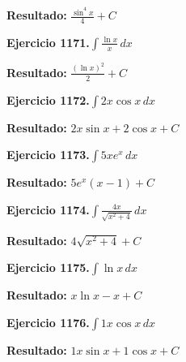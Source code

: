 \documentclass[10pt,a4paper]{article}
\begin{document}
\begin{solbox}
\textbf{Resultado:} \(\displaystyle \frac{\sin^{4}x}{4} + C\)
\end{solbox}

\newpage
\begin{ejbox}
\textbf{Ejercicio 1171.}\quad $\int \frac{\ln x}{x}\,dx$
\end{ejbox}

\begin{solbox}
\textbf{Resultado:} \(\displaystyle \frac{(\ln x)^2}{2} + C\)
\end{solbox}

\begin{ejbox}
\textbf{Ejercicio 1172.}\quad $\int 2x \cos x\,dx$
\end{ejbox}

\begin{solbox}
\textbf{Resultado:} \(\displaystyle 2x\sin x + 2\cos x + C\)
\end{solbox}

\begin{ejbox}
\textbf{Ejercicio 1173.}\quad $\int 5x e^{x}\,dx$
\end{ejbox}

\begin{solbox}
\textbf{Resultado:} \(\displaystyle 5e^x(x-1) + C\)
\end{solbox}

\newpage
\begin{ejbox}
\textbf{Ejercicio 1174.}\quad $\int \frac{4x}{\sqrt{x^2+4}}\,dx$
\end{ejbox}

\begin{solbox}
\textbf{Resultado:} \(\displaystyle 4\sqrt{x^2+4} + C\)
\end{solbox}

\begin{ejbox}
\textbf{Ejercicio 1175.}\quad $\int \ln x\,dx$
\end{ejbox}

\begin{solbox}
\textbf{Resultado:} \(\displaystyle x\ln x - x + C\)
\end{solbox}

\begin{ejbox}
\textbf{Ejercicio 1176.}\quad $\int 1x \cos x\,dx$
\end{ejbox}

\begin{solbox}
\textbf{Resultado:} \(\displaystyle 1x\sin x + 1\cos x + C\)
\end{solbox}
\end{document}

